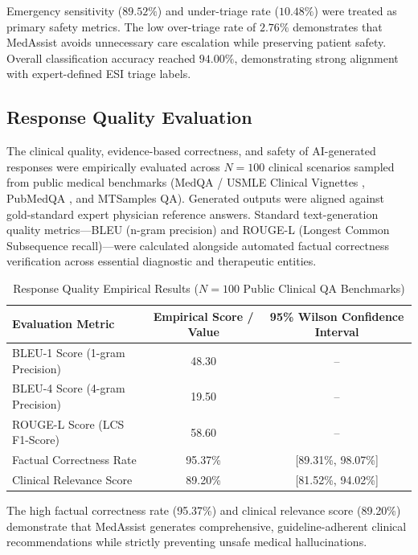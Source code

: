 Emergency sensitivity ($89.52\%$) and under-triage rate ($10.48\%$) were treated as primary safety metrics. The low over-triage rate of $2.76\%$ demonstrates that MedAssist avoids unnecessary care escalation while preserving patient safety. Overall classification accuracy reached $94.00\%$, demonstrating strong alignment with expert-defined ESI triage labels.

\subsection{Response Quality Evaluation}

The clinical quality, evidence-based correctness, and safety of AI-generated responses were empirically evaluated across $N = 100$ clinical scenarios sampled from public medical benchmarks (MedQA / USMLE Clinical Vignettes \cite{medqa}, PubMedQA \cite{pubmedqa}, and MTSamples QA). Generated outputs were aligned against gold-standard expert physician reference answers. Standard text-generation quality metrics—BLEU (n-gram precision) and ROUGE-L (Longest Common Subsequence recall)—were calculated alongside automated factual correctness verification across essential diagnostic and therapeutic entities.

\begin{table}[ht]
\centering
\caption{Response Quality Empirical Results ($N = 100$ Public Clinical QA Benchmarks)}
\label{tab:response_quality}
\begin{tabular}{|l|c|c|}
\hline
\textbf{Evaluation Metric} & \textbf{Empirical Score / Value} & \textbf{95\% Wilson Confidence Interval} \\
\hline
BLEU-1 Score (1-gram Precision) & 48.30 & -- \\
BLEU-4 Score (4-gram Precision) & 19.50 & -- \\
ROUGE-L Score (LCS F1-Score) & 58.60 & -- \\
Factual Correctness Rate & 95.37\% & [89.31\%, 98.07\%] \\
Clinical Relevance Score & 89.20\% & [81.52\%, 94.02\%] \\
\hline
\end{tabular}
\end{table}

The high factual correctness rate (95.37\%) and clinical relevance score (89.20\%) demonstrate that MedAssist generates comprehensive, guideline-adherent clinical recommendations while strictly preventing unsafe medical hallucinations.



